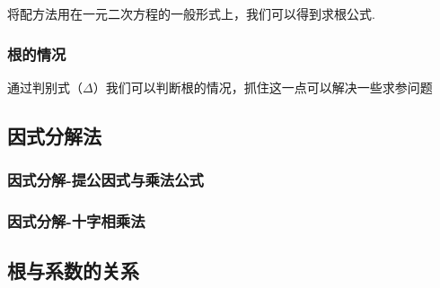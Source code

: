 \documentclass[lang=cn, 10pt, titlestyle=hang, oneside]{elegantbook}
\begin{document}
将配方法用在一元二次方程的一般形式上，我们可以得到求根公式.

\subsubsection{根的情况}

通过判别式（\(\Delta \)）我们可以判断根的情况，抓住这一点可以解决一些求参问题


\subsection{因式分解法}

\subsubsection{因式分解-提公因式与乘法公式}

\subsubsection{因式分解-十字相乘法}

\subsection{根与系数的关系}
                                                                                                                                                                                                                                                                                                                                                                                                                                                                                                                                                                                                                                                                                                                                                                                                                                                                                                                                                                                                                                                                                                                                                                                                                                                                                                                                    
\end{document}

